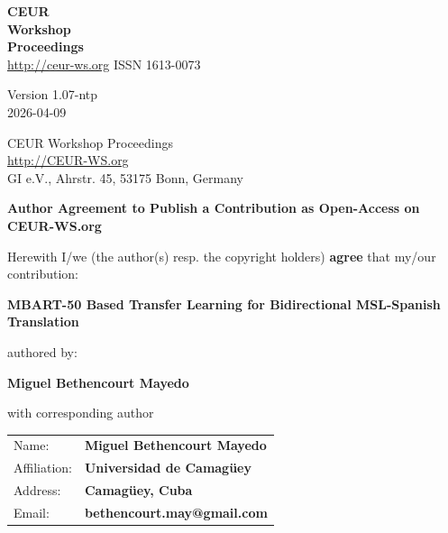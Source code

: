 \documentclass[a4paper,10pt]{article}
\begin{document}
\thispagestyle{empty}

\noindent
\begin{minipage}[t]{0.3\textwidth}
\textbf{\large CEUR}\\
\textbf{Workshop}\\
\textbf{Proceedings}\\
{\scriptsize \url{http://ceur-ws.org} \hfill ISSN 1613-0073}
\end{minipage}
\hfill
\begin{minipage}[t]{0.25\textwidth}
Version 1.07-ntp\\
2026-04-09
\end{minipage}
\hfill
\begin{minipage}[t]{0.4\textwidth}
CEUR Workshop Proceedings\\
\url{http://CEUR-WS.org}\\
GI e.V., Ahrstr. 45, 53175 Bonn, Germany
\end{minipage}

\vspace{0.6cm}

\begin{center}
{\Large \textbf{Author Agreement to Publish a Contribution as Open-Access on CEUR-WS.org}}
\end{center}

\vspace{0.3cm}

\noindent
Herewith I/we (the author(s) resp. the copyright holders) \textbf{agree} that my/our contribution:

\vspace{0.2cm}
\noindent
\textbf{MBART-50 Based Transfer Learning for Bidirectional MSL-Spanish Translation}
\vspace{0.2cm}

\noindent
authored by:

\vspace{0.2cm}
\noindent
\textbf{Miguel Bethencourt Mayedo}
\vspace{0.2cm}

\noindent
with corresponding author

\vspace{0.2cm}
\noindent
\begin{tabular}{@{}ll}
Name: & \textbf{Miguel Bethencourt Mayedo} \\
Affiliation: & \textbf{Universidad de Camag\"uey} \\
Address: & \textbf{Camag\"uey, Cuba} \\
Email: & \textbf{bethencourt.may@gmail.com}
\end{tabular}
\end{document}
